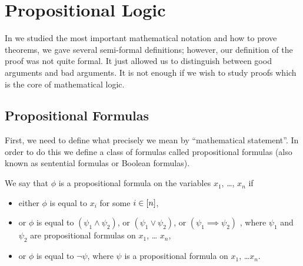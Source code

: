 \chapter{Propositional Logic}
In  we studied the most important
mathematical notation and how to prove theorems, we gave several semi-formal
definitions; however, our definition of the proof was not quite formal. It just
allowed us to distinguish between good arguments and bad arguments. It is not
enough if we wish to study proofs which is the core of mathematical logic.

\section{Propositional Formulas}


First, we need to define what precisely we mean by ``mathematical statement''.
In order to do this we define a class of formulas called propositional formulas
(also known as sentential formulas or Boolean formulas).
\begin{definition}
  We say that $\phi$ is a propositional formula on the variables $x_1$, \dots,
  $x_n$ if
  \begin{itemize}
    \item either $\phi$ is equal to $x_i$ for some $i \in [{n}]$,
    \item or $\phi$ is equal to $(\psi_1 \land \psi_2)$, or
      $(\psi_1 \lor \psi_2)$, or $(\psi_1 \implies \psi_2)$ ,
      where $\psi_1$ and $\psi_2$ are propositional formulas on $x_1$, \dots
      $x_n$,
    \item or $\phi$ is equal to $\lnot \psi$, where $\psi$ is a propositional
      formula on $x_1$, \dots $x_n$.
  \end{itemize}
\end{definition}

